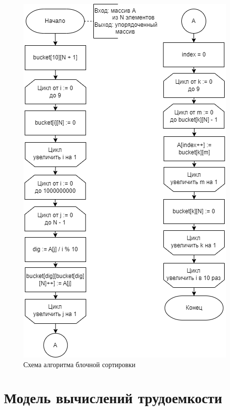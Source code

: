 \documentclass[a4paper,14pt, unknownkeysallowed]{extreport}
\begin{document}
\begin{figure}[h!]
	\centering
	\includegraphics[width=0.8\linewidth]{img/bucket_sort.png}
	\caption{Схема алгоритма блочной сортировки}
	\label{fig:bucket_sort}
\end{figure}

\section{Модель вычислений трудоемкости}
\end{document}
